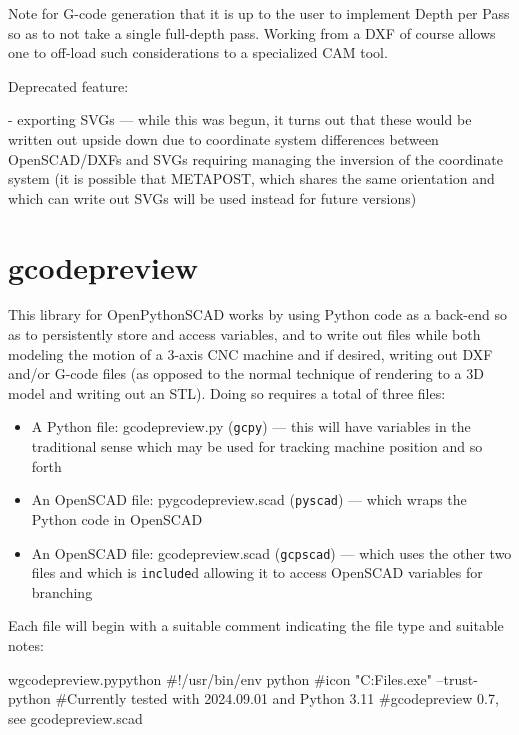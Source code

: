 \documentclass{ltxdoc}
\begin{document}
\begin{readme}
Note for G-code generation that it is up to the user 
to implement Depth per Pass so as to not take a 
single full-depth pass. Working from a DXF of course 
allows one to off-load such considerations to a 
specialized CAM tool.

Deprecated feature:

 - exporting SVGs --- while this was begun, it turns out that these would be written out upside down due to coordinate system differences between OpenSCAD/DXFs and SVGs requiring managing the inversion of the coordinate system (it is possible that METAPOST, which shares the same orientation and which can write out SVGs will be used instead for future versions)

\end{readme}

\clearpage
\section{gcodepreview}

This library for OpenPythonSCAD works by using Python code as a back-end so as to persistently store 
and access variables, and to write out files while both modeling the motion of a 3-axis CNC machine
and if desired, writing out DXF and/or G-code files (as opposed to the normal technique of 
rendering to a 3D model and writing out an STL). Doing so requires a total of three files:

\begin{itemize}
\item A Python file: gcodepreview.py (\texttt{gcpy}) --- this will have variables in the 
      traditional sense which may be used for tracking machine position and so forth
\item An OpenSCAD file: pygcodepreview.scad (\texttt{pyscad}) --- which wraps the Python code 
      in OpenSCAD
\item An OpenSCAD file: gcodepreview.scad (\texttt{gcpscad}) --- which uses the other two files 
      and which is \texttt{include}d allowing it to access OpenSCAD variables for branching   
\end{itemize}
 
Each file will begin with a suitable comment indicating the file type and suitable notes:

\begin{writecode}{w}{gcodepreview.py}{python}
#!/usr/bin/env python
#icon "C:\Program Files\PythonSCAD\bin\openscad.exe"  --trust-python
#Currently tested with 2024.09.01 and Python 3.11
#gcodepreview 0.7, see gcodepreview.scad

\end{writecode}
\addtocounter{gcpy}{6}
\end{document}
